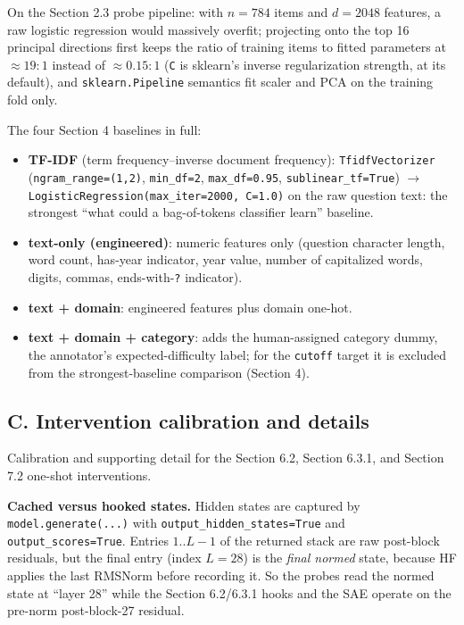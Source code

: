 On the Section 2.3 probe pipeline: with \(n = 784\) items and
\(d = 2048\) features, a raw logistic regression would massively
overfit; projecting onto the top 16 principal directions first keeps the
ratio of training items to fitted parameters at \(\approx 19{:}1\)
instead of \(\approx 0.15{:}1\) (\texttt{C} is sklearn's inverse
regularization strength, at its default), and \texttt{sklearn.Pipeline}
semantics fit scaler and PCA on the training fold only.

The four Section 4 baselines in full:

\begin{itemize}
\tightlist
\item
  \textbf{TF-IDF} (term frequency--inverse document frequency):
  \texttt{TfidfVectorizer} (\texttt{ngram\_range=(1,2)},
  \texttt{min\_df=2}, \texttt{max\_df=0.95},
  \texttt{sublinear\_tf=True}) \(\to\)
  \texttt{LogisticRegression(max\_iter=2000,\ C=1.0)} on the raw
  question text: the strongest ``what could a bag-of-tokens classifier
  learn'' baseline.
\item
  \textbf{text-only (engineered)}: numeric features only (question
  character length, word count, has-year indicator, year value, number
  of capitalized words, digits, commas, ends-with-\texttt{?} indicator).
\item
  \textbf{text + domain}: engineered features plus domain one-hot.
\item
  \textbf{text + domain + category}: adds the human-assigned category
  dummy, the annotator's expected-difficulty label; for the
  \texttt{cutoff} target it is excluded from the strongest-baseline
  comparison (Section 4).
\end{itemize}

\subsection{C. Intervention calibration and
details}\label{c.-intervention-calibration-and-details}

Calibration and supporting detail for the Section 6.2, Section 6.3.1,
and Section 7.2 one-shot interventions.

\textbf{Cached versus hooked states.} Hidden states are captured by
\texttt{model.generate(...)} with
\mbox{\texttt{output\_hidden\_states=True}} and
\mbox{\texttt{output\_scores=True}}. Entries \(1..L{-}1\) of the returned
stack are raw post-block residuals, but the final entry (index
\(L = 28\)) is the \emph{final normed} state, because HF applies the last
RMSNorm before recording it. So the probes read the normed state at
``layer 28'' while the Section 6.2/6.3.1 hooks and the SAE operate on
the pre-norm post-block-27 residual.

